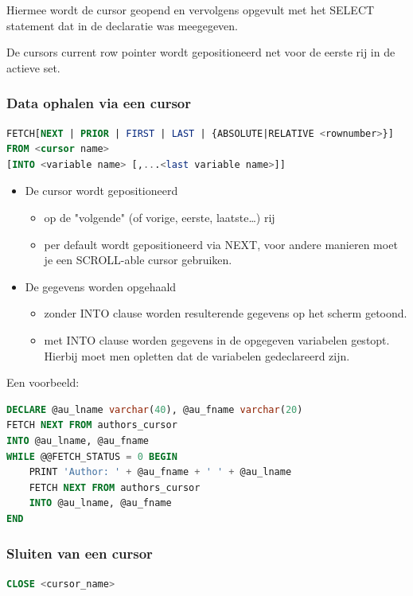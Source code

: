 \documentclass[a4paper,12pt]{article}
\begin{document}
Hiermee wordt de cursor geopend en vervolgens opgevult met het SELECT statement dat in de declaratie was meegegeven.

De cursors current row pointer wordt gepositioneerd net voor de eerste rij in de actieve set.

\subsubsection{Data ophalen via een cursor}
\begin{lstlisting}[language=sql, breaklines=true]
FETCH[NEXT | PRIOR | FIRST | LAST | {ABSOLUTE|RELATIVE <rownumber>}]
FROM <cursor name>
[INTO <variable name> [,...<last variable name>]]
\end{lstlisting}
\begin{itemize}
\item De cursor wordt gepositioneerd
	\begin{itemize}
	\item op de "volgende" (of vorige, eerste, laatste\dots) rij
	\item per default wordt gepositioneerd via NEXT, voor andere manieren moet je een SCROLL-able cursor gebruiken.
	\end{itemize}
\item De gegevens worden opgehaald
	\begin{itemize}
	\item zonder INTO clause worden resulterende gegevens op het scherm getoond.
	\item met INTO clause worden gegevens in de opgegeven variabelen gestopt. Hierbij moet men opletten dat de variabelen gedeclareerd zijn.
	\end{itemize}
\end{itemize}

Een voorbeeld:
\begin{lstlisting}[language=sql, breaklines=true]
DECLARE @au_lname varchar(40), @au_fname varchar(20)
FETCH NEXT FROM authors_cursor
INTO @au_lname, @au_fname
WHILE @@FETCH_STATUS = 0 BEGIN
	PRINT 'Author: ' + @au_fname + ' ' + @au_lname
	FETCH NEXT FROM authors_cursor
	INTO @au_lname, @au_fname
END
\end{lstlisting}

\subsubsection{Sluiten van een cursor}
\begin{lstlisting}[language=sql, breaklines=true]
CLOSE <cursor_name>
\end{lstlisting}
\end{document}
